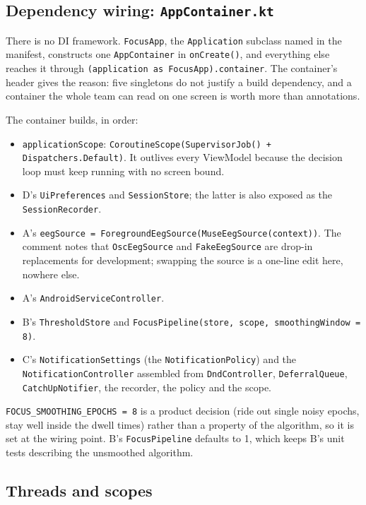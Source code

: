 \documentclass[10pt,a4paper]{article}
\newcommand{\file}[1]{\texttt{\small #1}}          %
\newcommand{\code}[1]{\texttt{#1}}                  %
\begin{document}
\subsection{Dependency wiring: \file{AppContainer.kt}}

There is no DI framework. \code{FocusApp}, the \code{Application} subclass named in the
manifest, constructs one \code{AppContainer} in \code{onCreate()}, and everything else reaches
it through \code{(application as FocusApp).container}. The container's header gives the reason:
five singletons do not justify a build dependency, and a container the whole team can read on one
screen is worth more than annotations.

The container builds, in order:
\begin{itemize}
\item \code{applicationScope}: \code{CoroutineScope(SupervisorJob() + Dispatchers.Default)}. It
  outlives every ViewModel because the decision loop must keep running with no screen bound.
\item D's \code{UiPreferences} and \code{SessionStore}; the latter is also exposed as the
  \code{SessionRecorder}.
\item A's \code{eegSource = ForegroundEegSource(MuseEegSource(context))}. The comment notes that
  \code{OscEegSource} and \code{FakeEegSource} are drop-in replacements for development; swapping
  the source is a one-line edit here, nowhere else.
\item A's \code{AndroidServiceController}.
\item B's \code{ThresholdStore} and \code{FocusPipeline(store, scope, smoothingWindow = 8)}.
\item C's \code{NotificationSettings} (the \code{NotificationPolicy}) and the
  \code{NotificationController} assembled from \code{DndController}, \code{DeferralQueue},
  \code{CatchUpNotifier}, the recorder, the policy and the scope.
\end{itemize}

\begin{why}
\code{FOCUS\_SMOOTHING\_EPOCHS = 8} is a product decision (ride out single noisy epochs, stay well
inside the dwell times) rather than a property of the algorithm, so it is set at the wiring point.
B's \code{FocusPipeline} defaults to 1, which keeps B's unit tests describing the unsmoothed
algorithm.
\end{why}

\subsection{Threads and scopes}
\end{document}
